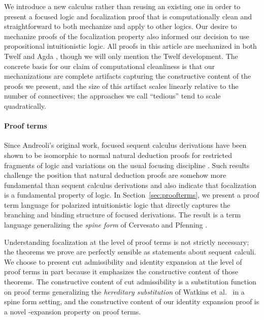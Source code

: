 \documentclass[acmtocl]{robtrans}\pdfoutput=1
\begin{document}
We introduce a new calculus rather than reusing an existing one in
order to present a focused logic and focalization proof that is
computationally clean and straightforward to both mechanize and
apply to other logics.  Our desire to
mechanize proofs of the focalization property also informed our
decision to use propositional intuitionistic logic.
All proofs in this
article are mechanized in both Twelf \cite{pfenning99system} and Agda
\cite{norell08towards}, though we will only mention the Twelf
development.
The concrete
basis for our claim of computational cleanliness is that our
mechanizations are complete artifacts capturing the constructive
content of the proofs we present, 
and the size of this artifact scales linearly
relative to the number of connectives; the approaches we call
``tedious'' tend to scale quadratically.

\paragraph*{Proof terms}
Since Andreoli's original work, focused sequent calculus derivations
have been shown to be isomorphic to normal natural deduction proofs
for restricted fragments of logic \cite{cervesato03linear} and
variations on the usual focusing discipline \cite{howe01proof}.  Such
results challenge the position that natural deduction proofs are
somehow more fundamental than sequent calculus derivations and also
indicate that focalization is a fundamental property of logic. In
Section~\ref{sec:proofterms}, we present a proof term language for
polarized intuitionistic logic that directly captures the branching
and binding structure of focused derivations. The result is a term
language generalizing the {\it spine form} of Cervesato and Pfenning
.

Understanding focalization at the level of proof terms is not strictly
necessary; the theorems we prove are perfectly sensible as statements
about sequent calculi.  We choose to present cut admissibility and
identity expansion at the level of proof terms in part because it
emphasizes the constructive content of those theorems. The
constructive content of cut admissibility is a substitution function
on proof terms generalizing the {\it hereditary substitution} of
Watkins et al.~ in a spine form
setting, and the constructive content of our identity expansion proof
is a novel -expansion property on proof terms.
\end{document}
